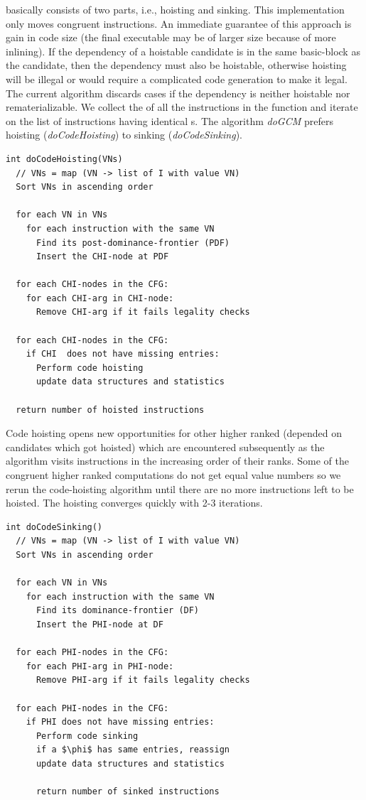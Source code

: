 \documentclass[sigplan,10pt,review,anonymous]{acmart}\settopmatter{printfolios=true,printccs=false,printacmref=false}
\begin{document}
\GCM{} basically consists of two parts, i.e., hoisting and sinking. This
implementation only moves congruent instructions. An immediate guarantee of this
approach is gain in code size (the final executable may be of larger size
because of more inlining). If the dependency of a hoistable candidate is in the
same basic-block as the candidate, then the dependency must also be hoistable,
otherwise hoisting will be illegal or would require a complicated code
generation to make it legal. The current algorithm discards cases if the
dependency is neither hoistable nor rematerializable. We collect the \GVN{} of
all the instructions in the function and iterate on the list of instructions
having identical \GVN{}s. The algorithm \emph{doGCM} prefers hoisting
(\emph{doCodeHoisting}) to sinking (\emph{doCodeSinking}).

\begin{lstlisting}
int doCodeHoisting(VNs)
  // VNs = map (VN -> list of I with value VN)
  Sort VNs in ascending order

  for each VN in VNs
    for each instruction with the same VN
      Find its post-dominance-frontier (PDF)
      Insert the CHI-node at PDF

  for each CHI-nodes in the CFG:
    for each CHI-arg in CHI-node:
      Remove CHI-arg if it fails legality checks

  for each CHI-nodes in the CFG:
    if CHI  does not have missing entries:
      Perform code hoisting
      update data structures and statistics

  return number of hoisted instructions
\end{lstlisting}


Code hoisting opens new opportunities for other higher ranked
\cite{rosen1988global} (depended on candidates which got hoisted) which are
encountered subsequently as the algorithm visits instructions in the increasing
order of their ranks. Some of the congruent higher ranked computations do not
get equal value numbers so we rerun the code-hoisting algorithm until there are
no more instructions left to be hoisted. The hoisting converges quickly with 2-3
iterations.

\begin{lstlisting}
int doCodeSinking()
  // VNs = map (VN -> list of I with value VN)
  Sort VNs in ascending order

  for each VN in VNs
    for each instruction with the same VN
      Find its dominance-frontier (DF)
      Insert the PHI-node at DF

  for each PHI-nodes in the CFG:
    for each PHI-arg in PHI-node:
      Remove PHI-arg if it fails legality checks

  for each PHI-nodes in the CFG:
    if PHI does not have missing entries:
      Perform code sinking
      if a $\phi$ has same entries, reassign
      update data structures and statistics

      return number of sinked instructions
\end{lstlisting}
\end{document}

